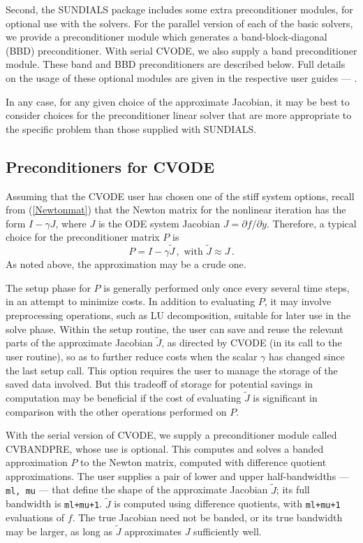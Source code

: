 Second, the SUNDIALS package includes some extra preconditioner
modules, for optional use with the solvers.  For the parallel version
of each of the basic solvers, we provide a preconditioner module which
generates a band-block-diagonal (BBD) preconditioner.  With serial
CVODE, we also supply a band preconditioner module.  These band and
BBD preconditioners are described below.  Full details on the usage
of these optional modules are given in the respective user guides
--- \cite{HiSe:03a,TaHi:98,HiTa:99}.

In any case, for any given choice of the approximate Jacobian, it may
be best to consider choices for the preconditioner linear solver that
are more appropriate to the specific problem than those supplied with
SUNDIALS.

\subsection{Preconditioners for CVODE}

Assuming that the CVODE user has chosen one of the stiff system
options, recall from (\ref{Newtonmat}) that the Newton matrix for
the nonlinear iteration has the form $I - \gamma J$, where $J$ is the
ODE system Jacobian $J = \partial f / \partial y$.  Therefore, a
typical choice for the preconditioner matrix $P$ is
\begin{equation*}
  P = I - \gamma \tilde{J} \, , \mbox{ with } \tilde{J} \approx J \, . 
\end{equation*}
As noted above, the approximation may be a crude one.  

The setup phase for $P$ is generally performed only once every several
time steps, in an attempt to minimize costs.  In addition to
evaluating $P$, it may involve preprocessing operations, such as LU
decomposition, suitable for later use in the solve phase.  Within the
setup routine, the user can save and reuse the relevant parts of the
approximate Jacobian $\tilde{J}$, as directed by CVODE (in its call to
the user routine), so as to further reduce costs when the scalar
$\gamma$ has changed since the last setup call.  This option requires the
user to manage the storage of the saved data involved.  But this
tradeoff of storage for potential savings in computation may be
beneficial if the cost of evaluating $\tilde{J}$ is significant in
comparison with the other operations performed on $P$.

With the serial version of CVODE, we supply a preconditioner module
called CVBANDPRE, whose use is optional.  This computes and solves a
banded approximation $P$ to the Newton matrix, computed with
difference quotient approximations.  The user supplies a pair of lower
and upper half-bandwidths --- {\tt ml, mu} --- that define the shape of
the approximate Jacobian $\tilde{J}$; its full bandwidth is
{\tt ml+mu+1}.  $\tilde{J}$ is computed using difference quotients,
with {\tt ml+mu+1} evaluations of $f$.  The true Jacobian need not be
banded, or its true bandwidth may be larger, as long as $\tilde{J}$
approximates $J$ sufficiently well.

